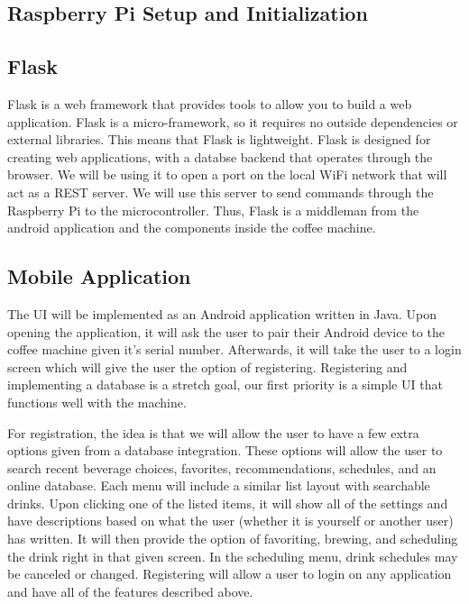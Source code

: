 \documentclass[conference]{IEEEtran}
\begin{document}
\subsection{Raspberry Pi Setup and Initialization}


\subsection{Flask}
Flask is a web framework that provides tools to allow you to build a web application.
Flask is a micro-framework, so it requires no outside dependencies or external libraries.
This means that Flask is lightweight. Flask is designed for creating web applications,
with a databse backend that operates through the browser. We will be using it to open
a port on the local WiFi network that will act as a REST server. We will use
this server to send commands through the Raspberry Pi to the microcontroller. Thus, Flask is a middleman from the 
android application and the components inside the coffee machine.

\subsection{Mobile Application}
The UI will be implemented as an Android application written in Java. Upon
opening the application, it will ask the user to pair their Android device to
the coffee machine given it's serial number. Afterwards, it will take the user
to a login screen which will give the user the option of registering.
Registering and implementing a database is a stretch goal, our first
priority is a simple UI that functions well with the machine.

For registration, the idea is that we will allow the user to have a few extra options given from a database
integration. These options will allow the user to search recent beverage
choices, favorites, recommendations, schedules, and an online database. Each
menu will include a similar list layout with searchable drinks. Upon clicking
one of the listed items, it will show all of the settings and have descriptions
based on what the user (whether it is yourself or another user) has written. It
will then provide the option of favoriting, brewing, and scheduling the drink
right in that given screen. In the scheduling menu, drink schedules may be
canceled or changed. Registering will allow a user to login on
any application and have all of the features described above.
\end{document}
